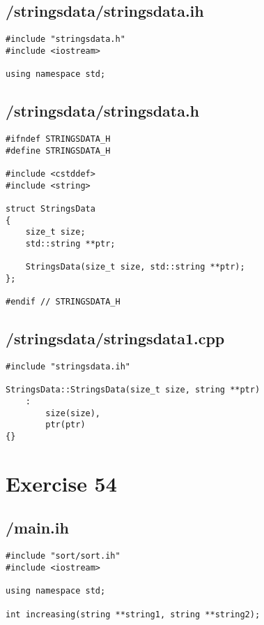 \documentclass{article}
\begin{document}
\subsection*{/stringsdata/stringsdata.ih}
\begin{verbatim}
#include "stringsdata.h"
#include <iostream>

using namespace std;

\end{verbatim}
\subsection*{/stringsdata/stringsdata.h}
\begin{verbatim}
#ifndef STRINGSDATA_H
#define STRINGSDATA_H

#include <cstddef>
#include <string>

struct StringsData 
{
    size_t size;
    std::string **ptr;

    StringsData(size_t size, std::string **ptr);
};

#endif // STRINGSDATA_H

\end{verbatim}
\subsection*{/stringsdata/stringsdata1.cpp}
\begin{verbatim}
#include "stringsdata.ih"

StringsData::StringsData(size_t size, string **ptr)
    :
        size(size),
        ptr(ptr)
{}

\end{verbatim}


\section*{Exercise 54}
\subsection*{/main.ih}
\begin{verbatim}
#include "sort/sort.ih"
#include <iostream>

using namespace std;

int increasing(string **string1, string **string2);

\end{verbatim}
\end{document}
